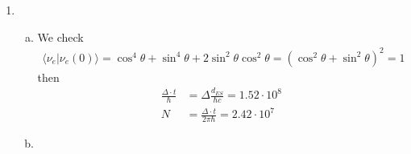 \documentclass[../main.tex]{subfiles}
\begin{document}
\begin{enumerate}
\begin{enumerate}[(a)]
\end{enumerate}
\item
\begin{enumerate}[(a)]
\item We check
\begin{align}
\langle\nu_e|\nu_e(0)\rangle
=\cos^4\theta+\sin^4\theta+2\sin^2\theta\cos^2\theta
=(\cos^2\theta+\sin^2\theta)^2
=1
\end{align}
then
\begin{align}
\frac{\Delta\cdot t}{\hbar}&=\Delta\frac{d_{ES}}{\hbar c}=1.52\cdot10^8\\
N&=\frac{\Delta\cdot t}{2\pi \hbar}=2.42\cdot 10^7
\end{align}
\item
\end{enumerate}
\end{enumerate}
\end{document}
